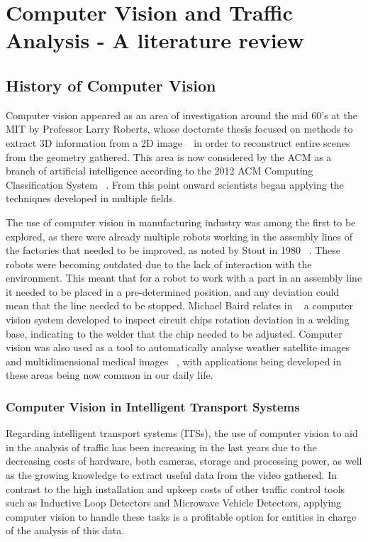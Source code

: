 
\chapter{Computer Vision and Traffic Analysis - A literature review} \label{chap:sota}

\section{History of Computer Vision}

Computer vision appeared as an area of investigation around the mid 60's at the MIT by Professor Larry Roberts, whose doctorate thesis focused on methods to extract 3D information from a 2D image ~\cite{huang_computer_1996} in order to reconstruct entire scenes from the geometry gathered. This area is now considered by the ACM as a branch of artificial intelligence according to the 2012 ACM Computing Classification System ~\cite{acm_2012_2012}. From this point onward scientists began applying the techniques developed in multiple fields.

The use of computer vision in manufacturing industry was among the first to be explored, as there were already multiple robots working in the assembly lines of the factories that needed to be improved, as noted by Stout in 1980 ~\cite{stout_computer_1980}. These robots were becoming outdated due to the lack of interaction with the environment. This meant that for a robot to work with a part in an assembly line it needed to be placed in a pre-determined position, and any deviation could mean that the line needed to be stopped. Michael Baird relates in ~\cite{l._baird_sight-i:_1978} a computer vision system developed to inspect circuit chips rotation deviation in a welding base, indicating to the welder that the chip needed to be adjusted. Computer vision was also used as a tool to automatically analyse weather satellite images ~\cite{binford_computer_1973-2} and multidimensional medical images ~\cite{ayache_medical_1998}, with applications being developed in these areas being now common in our daily life.

\subsection{Computer Vision in Intelligent Transport Systems}

Regarding intelligent transport systems (ITSs), the use of computer vision to aid in the analysis of traffic has been increasing in the last years due to the decreasing costs of hardware, both cameras, storage and processing power, as well as the growing knowledge to extract useful data from the video gathered. In contrast to the high installation and upkeep costs of other traffic control tools such as Inductive Loop Detectors and Microwave Vehicle Detectors, applying computer vision to handle these tasks is a profitable option for entities in charge of the analysis of this data.


